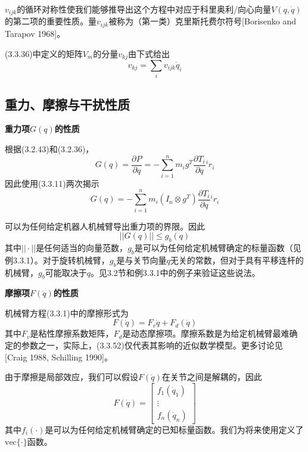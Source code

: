 \documentclass[12pt,a4paper]{ctexart}
\begin{document}
$v_{ijk}$的循环对称性使我们能够推导出这个方程中对应于科里奥利/向心向量$V(q,\dot{q})$的第二项的重要性质。量$v_{ijk}$被称为（第一类）克里斯托费尔符号[Borisenko and Tarapov 1968]。

(3.3.36)中定义的矩阵$V_m$的分量$v_{kj}$由下式给出
\begin{equation}
v_{kj} = \sum_{i}v_{ijk}\dot{q}_i
\end{equation}

\subsection{重力、摩擦与干扰性质}

\textbf{重力项$G(q)$的性质}

根据(3.2.43)和(3.2.36)，
\begin{equation}
G(q) = \frac{\partial P}{\partial q} = -\sum_{i=1}^{n}m_i g^T \frac{\partial T_i}{\partial q}{^ir_i}
\end{equation}
因此使用(3.3.11)两次揭示
\begin{equation}
G(q) = -\sum_{i=1}^{n}m_i (I_n \otimes g^T)\frac{\partial T_i}{\partial q}{^ir_i}
\end{equation}

可以为任何给定机器人机械臂导出重力项的界限。因此
\begin{equation}
||G(q)|| \leq g_b(q)
\end{equation}
其中$||\cdot||$是任何适当的向量范数，$g_b$是可以为任何给定机械臂确定的标量函数（见例3.3.1）。对于旋转机械臂，$g_b$是与关节向量$q$无关的常数，但对于具有平移连杆的机械臂，$g_b$可能取决于$q$。见3.2节和例3.3.1中的例子来验证这些说法。

\textbf{摩擦项$F(\dot{q})$的性质}

机械臂方程(3.3.1)中的摩擦形式为
\begin{equation}
F(\dot{q}) = F_v\dot{q} + F_d(\dot{q})
\end{equation}
其中$F_v$是粘性摩擦系数矩阵，$F_d$是动态摩擦项。摩擦系数是为给定机械臂最难确定的参数之一，实际上，(3.3.52)仅代表其影响的近似数学模型。更多讨论见[Craig 1988, Schilling 1990]。

由于摩擦是局部效应，我们可以假设$F(\dot{q})$在关节之间是解耦的，因此
\begin{equation}
F(\dot{q}) = \begin{bmatrix} f_1(\dot{q}_1) \\ \vdots \\ f_n(\dot{q}_n) \end{bmatrix}
\end{equation}
其中$f_i(\cdot)$是可以为任何给定机械臂确定的已知标量函数。我们为将来使用定义了$\text{vec}\{\cdot\}$函数。
\end{document}
